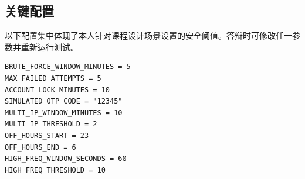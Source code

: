 \documentclass[bwprint]{report}
\begin{document}
\subsection{关键配置}
以下配置集中体现了本人针对课程设计场景设置的安全阈值。答辩时可修改任一参数并重新运行测试。

\begin{lstlisting}[caption={本人设计的安全阈值（config.py 节选）}, label={lst:config}]
BRUTE_FORCE_WINDOW_MINUTES = 5
MAX_FAILED_ATTEMPTS = 5
ACCOUNT_LOCK_MINUTES = 10
SIMULATED_OTP_CODE = "12345"
MULTI_IP_WINDOW_MINUTES = 10
MULTI_IP_THRESHOLD = 2
OFF_HOURS_START = 23
OFF_HOURS_END = 6
HIGH_FREQ_WINDOW_SECONDS = 60
HIGH_FREQ_THRESHOLD = 10
\end{lstlisting}



\end{document}
